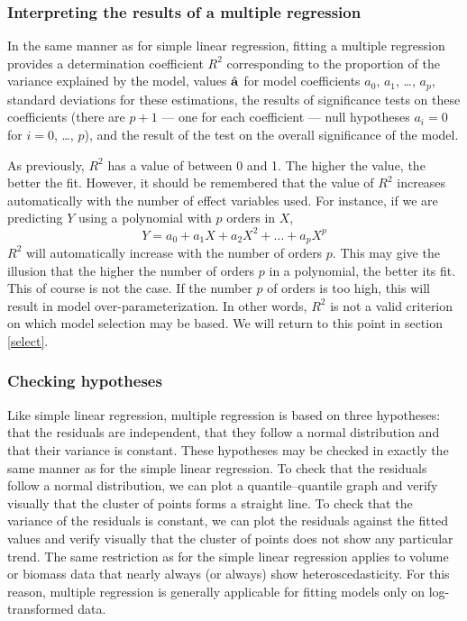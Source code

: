 \subsubsection{Interpreting the results of a multiple regression\label{irm}}

In the same manner as for simple linear regression, fitting a multiple regression provides a determination coefficient $R^2$ corresponding to the proportion of the variance explained by the model, values $\hat{\mathbf{a}}$ for model coefficients $a_0$, $a_1$, \ldots, $a_p$, standard deviations for these estimations, the results of significance tests on these coefficients (there are $p+1$ --- one for each coefficient --- null hypotheses $a_i=0$ for $i=0$, \ldots, $p$), and the result of the test on the overall significance of the model.

As previously, $R^2$ has a value of between 0 and 1. The higher the value, the better the fit. However, it should be remembered that the value of $R^2$ increases automatically with the number of effect variables used. For instance, if we are predicting $Y$ using a polynomial with $p$ orders in $X$,
\[
Y=a_0+a_1X+a_2X^2+\ldots+a_pX^p
\]
$R^2$ will automatically increase with the number of orders $p$. This may give the illusion that the higher the number of orders $p$ in a polynomial, the better its fit. This of course is not the case. If the number $p$ of orders is too high, this will result in model over-parameterization. In other words, $R^2$ is not a valid criterion on which model selection may be based. We will return to this point in section \ref{select}.

\subsubsection{Checking hypotheses}

Like simple linear regression, multiple regression is based on three hypotheses: that the residuals are independent, that they follow a normal distribution and that their variance is constant. These hypotheses may be checked in exactly the same manner as for the simple linear regression. To check that the residuals follow a normal distribution, we can plot a quantile--quantile graph and verify visually that the cluster of points forms a straight line. To check that the variance of the residuals is constant, we can plot the residuals against the fitted values and verify visually that the cluster of points does not show any particular trend.
The same restriction as for the simple linear regression applies to volume or biomass data that nearly always (or always) show heteroscedasticity. For this reason, multiple regression is generally applicable for fitting models only on log-transformed data.

